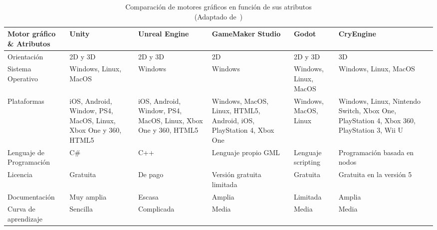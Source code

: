 \begin{table}[ht]
    \hspace*{-25pt}
    \centering
    \begin{tabularx}{1.1\textwidth}{|X|X|X|X|X|X|X|}
        \hline
        \textbf{Motor gráfico  \& Atributos} & \textbf{Unity} & \textbf{Unreal Engine} & \textbf{GameMaker Studio} & \textbf{Godot} & \textbf{CryEngine}\\\hline
        Orientación                 & 2D y 3D                                                       &2D y 3D                                                          & 2D                            & 2D y 3D               & 3D \\\hline
        Sistema Operativo           & Windows, Linux, MacOS                                           & Windows                                                         & Windows                       & Windows, Linux, MacOS               & Windows, Linux, MacOS\\\hline
        Plataformas                 & iOS, Android, Window, PS4, MacOS,  Linux, Xbox One y 360, HTML5 & iOS, Android, Window, PS4, MacOS,  Linux, Xbox One y 360, HTML5   & Windows, MacOS, Linux, HTML5, Android, iOS, PlayStation 4, Xbox One & Windows, MacOS, Linux    & Windows, Linux, Nintendo Switch, Xbox One, PlayStation 4, Xbox 360, PlayStation 3, Wii U\\\hline
        Lenguaje de Programación    & C\#                                                           & C++                                                             & Lenguaje propio GML           & Lenguaje scripting & Programación basada en nodos \\\hline
        Licencia                    & Gratuita                                                      & De pago                                                         & Versión gratuita limitada     & Gratuita              &  Gratuita en la versión 5\\\hline
        Documentación               & Muy amplia                                                    & Escasa                                                          & Amplia                        & Limitada              & Amplia\\\hline
        Curva de aprendizaje        & Sencilla                                                      & Complicada                                                      & Media                         & Media                 & Media \\\hline
    \end{tabularx}
    \caption{Comparación de motores gráficos en función de sus atributos \\ (Adaptado de~\cite{gonjar2019desarrollo})}
    \label{tab: graphics-engines}
\end{table}


